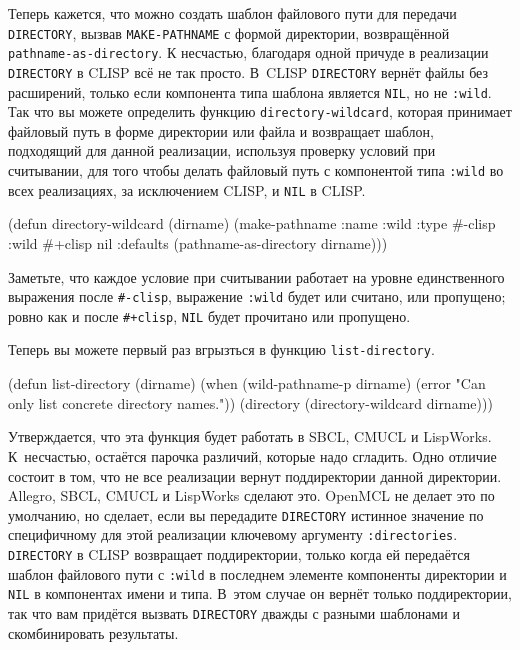 Теперь кажется, что можно создать шаблон файлового пути для передачи \lstinline{DIRECTORY},
вызвав \lstinline{MAKE-PATHNAME} с формой директории, возвращённой
\lstinline{pathname-as-directory}. К несчастью, благодаря одной причуде в реализации
\lstinline{DIRECTORY} в CLISP всё не так просто. В~CLISP \lstinline{DIRECTORY} вернёт файлы без
расширений, только если компонента типа шаблона является \lstinline{NIL}, но не
\lstinline{:wild}. Так что вы можете определить функцию \lstinline{directory-wildcard}, которая
принимает файловый путь в форме директории или файла и возвращает шаблон, подходящий для
данной реализации, используя проверку условий при считывании, для того чтобы делать
файловый путь с компонентой типа \lstinline{:wild} во всех реализациях, за исключением CLISP, и
\lstinline{NIL} в CLISP.

\begin{myverb}
(defun directory-wildcard (dirname)
  (make-pathname
   :name :wild
   :type #-clisp :wild #+clisp nil
   :defaults (pathname-as-directory dirname)))
\end{myverb}

Заметьте, что каждое условие при считывании работает на уровне единственного выражения
после \lstinline!#-clisp!, выражение \lstinline{:wild} будет или считано, или пропущено; ровно
как и после \lstinline!#+clisp!, \lstinline{NIL} будет прочитано или пропущено.

Теперь вы можете первый раз вгрызться в функцию \lstinline{list-directory}.

\begin{myverb}
(defun list-directory (dirname)
  (when (wild-pathname-p dirname)
    (error "Can only list concrete directory names."))
  (directory (directory-wildcard dirname)))
\end{myverb}

Утверждается, что эта функция будет работать в SBCL, CMUCL и LispWorks. К~несчастью,
остаётся парочка различий, которые надо сгладить. Одно отличие состоит в том, что не все
реализации вернут поддиректории данной директории. Allegro, SBCL, CMUCL и LispWorks
сделают это. OpenMCL не делает это по умолчанию, но сделает, если вы передадите
\lstinline{DIRECTORY} истинное значение по специфичному для этой реализации ключевому аргументу
\lstinline{:directories}. \lstinline{DIRECTORY} в CLISP возвращает поддиректории, только когда ей
передаётся шаблон файлового пути с \lstinline{:wild} в последнем элементе компоненты директории
и \lstinline{NIL} в компонентах имени и типа. В~этом случае он вернёт только поддиректории,
так что вам придётся вызвать \lstinline{DIRECTORY} дважды с разными шаблонами и скомбинировать
результаты.

